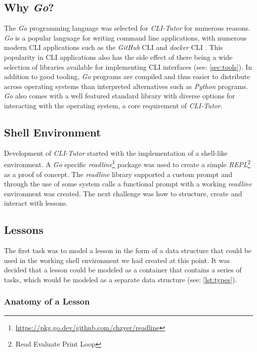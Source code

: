 \subsection{Why \textit{Go}?} The \textit{Go} programming language was selected
for \textit{CLI-Tutor} for numerous reasons. \textit{Go} is a popular language
for writing command line applications, with numerous modern CLI applications
such as the \textit{GitHub} CLI \cite{github_cli} and \textit{docker} CLI
\cite{dockerinc_2022}. This popularity in CLI applications also has the side
effect of there being a wide selection of libraries available for implementing
CLI interfaces (see: \autoref{sec:tools}). In addition to good tooling,
\textit{Go} programs are compiled and thus easier to distribute across
operating systems than interpreted alternatives such as \textit{Python}
programs. \textit{Go} also comes with a well featured standard library with
diverse options for interacting with the operating system, a core requirement
of \textit{CLI-Tutor}.


\subsection{Shell Environment}

Development of \textit{CLI-Tutor} started with the implementation of a
shell-like environment. A  \textit{Go} specific
\textit{readline}\footnote{\url{https://pkg.go.dev/github.com/chzyer/readline}}
package was used to create a simple \textit{REPL}\footnote{Read Evaluate Print
Loop} as a proof of concept. The \textit{readline} library supported a custom
prompt and through the use of some system calls a functional prompt with a
working \textit{readline} environment was created. The next challenge was how
to structure, create and interact with lessons.

\subsection{Lessons}

The first task was to model a lesson in the form of a data structure that could
be used in the working shell environment we had created at this point. It was
decided that a lesson could be modeled as a container that contains a series of
tasks, which would be modeled as a separate data structure (see: \autoref{lst:types}).

\subsubsection{Anatomy of a Lesson}

